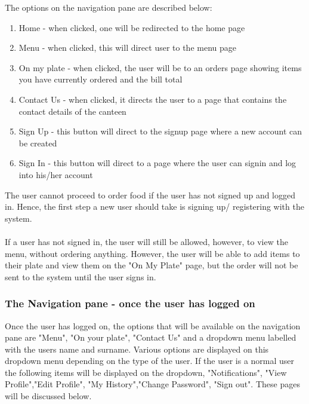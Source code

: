 \documentclass[a4paper,12pt]{report}
\begin{document}
The options on the navigation pane are described below:
\begin{enumerate}
\item Home -  when clicked, one will be redirected to the home page
\item Menu - when clicked, this will direct user to the menu page
\item On my plate -  when clicked, the user will be to an orders page showing items you have currently ordered and the bill total
\item Contact Us - when clicked, it directs the user to a page that contains the contact details of the canteen 
\item Sign Up - this button will direct to the signup page where a new account can be created
\item Sign In - this button will direct to a page where the user can signin and log into his/her account
\end{enumerate}

The user cannot proceed to order food if the user has not signed up and logged in. Hence, the first step a new user should take is signing up/ registering with the system. 
\\ \\
If a user has not signed in, the user will still be allowed, however, to view the menu, without ordering anything. However, the user will be able to add items to their plate and view them on the "On My Plate" page, but the order will not be sent to the system until the user signs in.


\subsubsection{The Navigation pane - once the user has logged on}
Once the user has logged on, the options that will be available on the navigation pane are  "Menu", "On your plate", "Contact Us" and a dropdown menu labelled with the users name and surname. Various options are displayed on this dropdown menu depending on the type of the user. If the user is a normal user the following items will be displayed on the dropdown, "Notifications", "View Profile","Edit Profile", "My History","Change Password", "Sign out". These pages will be discussed below.
\end{document}
